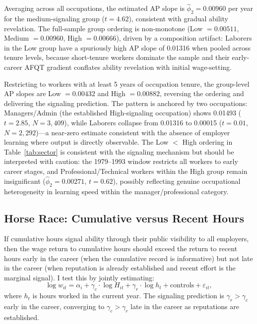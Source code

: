 \documentclass[12pt]{article}
\theoremstyle{definition}
\theoremstyle{remark}
\begin{document}
Averaging across all occupations, the estimated AP slope is $\hat{\phi}_2 = 0.00960$ per year
for the medium-signaling group ($t = 4.62$), consistent with gradual ability revelation. The
full-sample group ordering is non-monotone (Low $= 0.00511$, Medium $= 0.00960$, High $= 0.00666$),
driven by a composition artifact: Laborers in the Low group have a spuriously high AP slope
of 0.01316 when pooled across tenure levels, because short-tenure workers dominate the sample
and their early-career AFQT gradient conflates ability revelation with initial wage-setting.

Restricting to workers with at least 5 years of occupation tenure, the group-level AP slopes are
Low $= 0.00432$ and High $= 0.00882$, reversing the ordering and delivering the signaling
prediction. The pattern is anchored by two occupations: Managers/Admin (the established
High-signaling occupation) shows 0.01493 ($t = 2.85$, $N = 3{,}409$), while Laborers collapse
from 0.01316 to 0.00015 ($t = 0.01$, $N = 2{,}292$)---a near-zero estimate consistent with
the absence of employer learning where output is directly observable. The Low $<$ High ordering
in Table~\ref{tab:sector} is consistent with the signaling mechanism but should be interpreted
with caution: the 1979--1993 window restricts all workers to early career stages, and
Professional/Technical workers within the High group remain insignificant ($\hat{\phi}_2 =
0.00271$, $t = 0.62$), possibly reflecting genuine occupational heterogeneity in learning speed
within the manager/professional category.

\subsection{Horse Race: Cumulative versus Recent Hours}

If cumulative hours signal ability through their public visibility to all employers, then
the wage return to cumulative hours should exceed the return to recent hours early in the
career (when the cumulative record is informative) but not late in the career (when
reputation is already established and recent effort is the marginal signal). I test this
by jointly estimating:
\begin{equation}
\label{eq:horse}
\log w_{it} = \alpha_i + \gamma_c \cdot \log H_{it} + \gamma_r \cdot \log h_t
+ \text{controls} + \varepsilon_{it},
\end{equation}
where $h_t$ is hours worked in the current year. The signaling prediction is
$\gamma_r > \gamma_c$ early in the career, converging to $\gamma_c > \gamma_r$ late in the
career as reputations are established.
\end{document}
